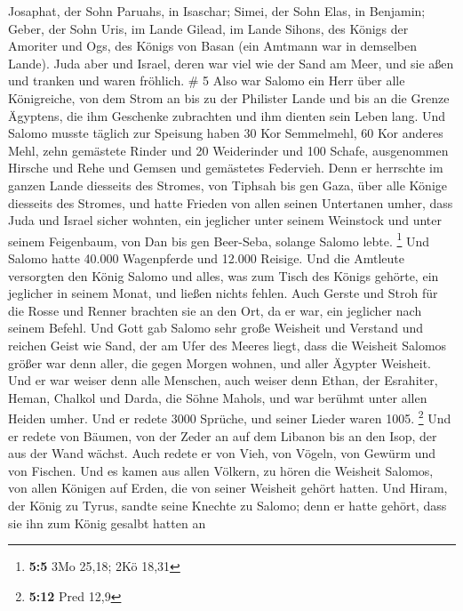  Josaphat, der Sohn Paruahs, in Isaschar; 
Simei, der Sohn Elas, in Benjamin;  Geber, der Sohn Uris,
im Lande Gilead, im Lande Sihons, des Königs der Amoriter und Ogs, des
Königs von Basan (ein Amtmann war in demselben Lande). 
Juda aber und Israel, deren war viel wie der Sand am Meer, und sie aßen
und tranken und waren fröhlich. \# 5  Also war Salomo ein
Herr über alle Königreiche, von dem Strom an bis zu der Philister Lande
und bis an die Grenze Ägyptens, die ihm Geschenke zubrachten und ihm
dienten sein Leben lang.  Und Salomo musste täglich zur
Speisung haben 30 Kor Semmelmehl, 60 Kor anderes Mehl, 
zehn gemästete Rinder und 20 Weiderinder und 100 Schafe, ausgenommen
Hirsche und Rehe und Gemsen und gemästetes Federvieh. 
Denn er herrschte im ganzen Lande diesseits des Stromes, von Tiphsah bis
gen Gaza, über alle Könige diesseits des Stromes, und hatte Frieden von
allen seinen Untertanen umher,  dass Juda und Israel
sicher wohnten, ein jeglicher unter seinem Weinstock und unter seinem
Feigenbaum, von Dan bis gen Beer-Seba, solange Salomo lebte. \footnote{\textbf{5:5}
  3Mo 25,18; 2Kö 18,31}  Und Salomo hatte 40.000
Wagenpferde und 12.000 Reisige.  Und die Amtleute
versorgten den König Salomo und alles, was zum Tisch des Königs gehörte,
ein jeglicher in seinem Monat, und ließen nichts fehlen. 
Auch Gerste und Stroh für die Rosse und Renner brachten sie an den Ort,
da er war, ein jeglicher nach seinem Befehl.  Und Gott gab
Salomo sehr große Weisheit und Verstand und reichen Geist wie Sand, der
am Ufer des Meeres liegt,  dass die Weisheit Salomos
größer war denn aller, die gegen Morgen wohnen, und aller Ägypter
Weisheit.  Und er war weiser denn alle Menschen, auch
weiser denn Ethan, der Esrahiter, Heman, Chalkol und Darda, die Söhne
Mahols, und war berühmt unter allen Heiden umher.  Und er
redete 3000 Sprüche, und seiner Lieder waren 1005. \footnote{\textbf{5:12}
  Pred 12,9}  Und er redete von Bäumen, von der Zeder an
auf dem Libanon bis an den Isop, der aus der Wand wächst. Auch redete er
von Vieh, von Vögeln, von Gewürm und von Fischen.  Und es
kamen aus allen Völkern, zu hören die Weisheit Salomos, von allen
Königen auf Erden, die von seiner Weisheit gehört hatten.
 Und Hiram, der König zu Tyrus, sandte seine Knechte zu
Salomo; denn er hatte gehört, dass sie ihn zum König gesalbt hatten an
